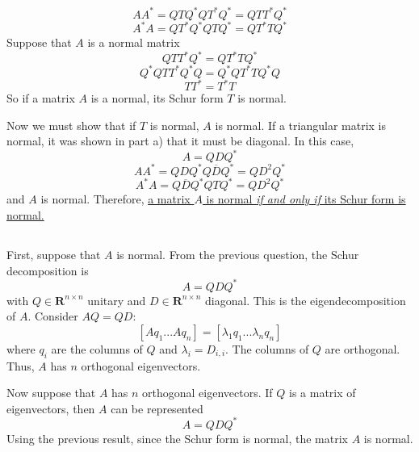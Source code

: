 \documentclass[11pt]{article} %
\begin{document}
\begin{equation}
AA^* = Q T Q^* Q T^* Q^* = Q T T^* Q^*
\end{equation}
\begin{equation}
A^*A = Q T^* Q^* Q T Q^* = Q T^* T Q^*
\end{equation}
Suppose that $A$ is a normal matrix
\begin{equation}
 Q T T^* Q^* = Q T^* T Q^*
\end{equation}
\begin{equation}
 Q^* Q T T^* Q^* Q =  Q^* Q T^* T Q^* Q
\end{equation}
\begin{equation}
T T^*  =   T^* T 
\end{equation}
So if  a matrix $A$ is a normal, its Schur form $T$ is normal. 

Now we must show that if $T$ is normal, $A$ is normal. If a triangular matrix is normal, it was shown in part a) that it must be diagonal. In this case,
\begin{equation}
A = Q D Q^*
\end{equation}
\begin{equation}
AA^* = Q D Q^* Q \overline{D} Q^* = Q D^2 Q^*
\end{equation}
\begin{equation}
A^*A = Q \overline{D} Q^* Q T Q^* = Q D^2 Q^*
\end{equation}
and $A$ is normal. Therefore, \uline{a matrix $A$ is normal \emph{if and only if} its Schur form is normal.}
\subsection{} %
First, suppose that $A$ is normal. From the previous question, the Schur decomposition is
\begin{equation}
A = Q D Q^*
\end{equation}
with  $Q \in \mathbf{R}^{n \times n}$  unitary and $D \in \mathbf{R}^{n \times n}$ diagonal. This is the eigendecomposition of $A$. Consider $AQ = Q D$:
\begin{equation}
\left [ A q_1 ... A q_n \right ] = \left [ \lambda_1 q_1 ... \lambda_n q_n \right ]
\end{equation}
where $q_i$ are the columns of $Q$ and $\lambda_i = D_{i,i}$. The columns of $Q$ are orthogonal. Thus, $A$ has $n$ orthogonal eigenvectors.

Now suppose that $A$ has $n$ orthogonal eigenvectors. If $Q$ is a matrix of eigenvectors, then $A$ can be represented
\begin{equation}
A= Q D Q^*
\end{equation}
Using the previous result, since the Schur form is normal, the matrix $A$ is normal.
\end{document}
